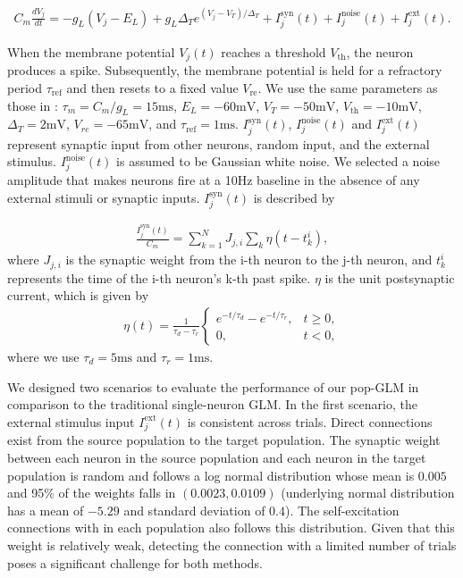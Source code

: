 \documentclass[12pt]{article}
\begin{document}
\begin{align}
C_m \frac{dV_j}{dt} = -g_L (V_j - E_L) + g_L \Delta_T e^{(V_j - V_T)/\Delta_T} + I^{\text{syn}}_j (t) + I^{\text{noise}}_j (t) + I^{\text{ext}}_j (t).
\end{align}

When the membrane potential $V_j(t)$ reaches a threshold $V_{\text{th}}$, the neuron produces a spike. Subsequently, the membrane potential is held for a refractory period $\tau_{\text{ref}}$ and then resets to a fixed value $V_{\text{re}}$. We use the same parameters as those in \citet{huang2019circuit}: $\tau_m=C_m/g_L=15\text{ms}$, $E_L=-60\text{mV}$, $V_T=-50\text{mV}$, $V_{\text{th}}=-10\text{mV}$, $\Delta_T=2\text{mV}$, $V_{re}=-65\text{mV}$, and $\tau_{\text{ref}}=1\text{ms}$. 
$I^{\text{syn}}_j(t)$, $I^{\text{noise}}_j (t)$ and $I^{\text{ext}}_j (t)$ represent synaptic input from other neurons, random input, and the external stimulus. $I^{\text{noise}}_j (t)$ is assumed to be Gaussian white noise. We selected a noise amplitude that makes neurons fire at a 10Hz baseline in the absence of any external stimuli or synaptic inputs. $I^{\text{syn}}_j(t)$ is described by

\begin{align}
\frac{I^{\text{syn}}_j (t)}{C_m} = \sum_{k=1}^N J_{j,i} \sum_k \eta (t-t_k^i),
\end{align}
where $J_{j,i}$ is the synaptic weight from the i-th neuron to the j-th neuron, and $t_k^i$ represents the time of the i-th neuron's k-th past spike. $\eta$ is the unit postsynaptic current, which is given by
\begin{align}
\eta(t) = \frac{1}{\tau_d-\tau_r} \left\{
\begin{array}{ll}
e^{-t/\tau_d} - e^{-t/\tau_r}, & t\geq 0,\\ 
0, & t<0,
\end{array}
\right.
\end{align}
where we use $\tau_d=5\text{ms}$ and $\tau_r=1\text{ms}$. 

We designed two scenarios to evaluate the performance of our pop-GLM in comparison to the traditional single-neuron GLM. 
In the first scenario, the external stimulus input $I^{\text{ext}}_j (t)$ is consistent across trials. Direct connections exist from the source population to the target population. The synaptic weight between each neuron in the source population and each neuron in the target population is random and follows a log normal distribution whose mean is $0.005$ and 95\% of the weights falls in $(0.0023, 0.0109)$ (underlying normal distribution has a mean of $-5.29$ and standard deviation of $0.4$). The self-excitation connections with in each population also follows this distribution. Given that this weight is relatively weak, detecting the connection with a limited number of trials poses a significant challenge for both methods. 
\end{document}
